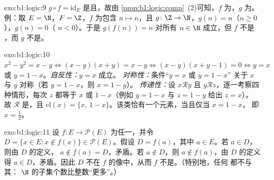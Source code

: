 \begin{solution}{exo:b1:logic:9}
$g \circ f = \mathrm{id}_E$ 是且，故由
\cref{prop:b1:logic:comp}~(2)可知，$f$ 为，$g$ 为。
例：取 $E = \N$，$F = \Z$，$f$ 为包含 $n \mapsto n$，且
$g \colon \Z \to \N$，$g(n) = n$（$n \geq 0$），$g(n) = 0$（
$n < 0$）。于是 $g(f(n)) = n$ 对所有 $n \in \N$ 成立，但 $f$ 不是
，而 $g$ 不是。
\end{solution}

\begin{solution}{exo:b1:logic:10}
$x^2 - y^2 = x - y \iff (x - y)(x + y) = x - y \iff (x - y)(x + y - 1)
= 0 \iff y = x$ 或 $y = 1 - x$。\emph{自反性：}$y = x$ 成立。
\emph{对称性：}条件“$y = x$ 或 $y = 1 - x$”
        关于 $x$ 与 $y$ 对称（若 $y = 1 - x$，则 $x = 1 - y$）。
\emph{传递性：}设 $x \mathbin{\mathcal{R}} y$ 且 $y
\mathbin{\mathcal{R}} z$，逐一考察四种情形，每次 $z$ 都等于 $x$
或 $1 - x$（例如 $y = 1 - x$ 与 $z = 1 - y$ 给出 $z = x$）。
故 $\mathcal{R}$ 是，且 $\mathrm{cl}(x) =
\{x,\, 1 - x\}$。该类恰有一个元素，当且仅当 $x = 1 - x$，
即 $x = \frac12$。
\end{solution}

\begin{solution}{exo:b1:logic:11}
设 $f \colon E \to \mathcal{P}(E)$ 为任一，并令
$D = \{x \in E : x \notin f(x)\} \in \mathcal{P}(E)$。假设 $D =
f(a)$，其中 $a \in E$。若 $a \in D$，则由 $D$ 的定义，
$a \notin f(a) = D$，矛盾。若 $a \notin D$，则 $a \notin
f(a)$，由 $D$ 的定义得 $a \in D$，矛盾。因此 $D$
不在 $f$ 的像中，从而 $f$ 不是。（特别地，任何
都不与其：
$\N$ 的子集个数比整数“更多”。）
\end{solution}

